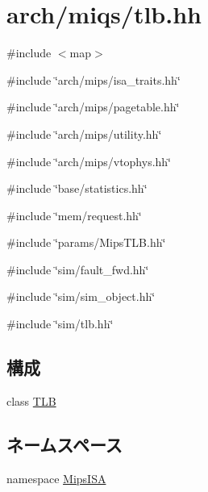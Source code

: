 \hypertarget{arch_2miqs_2tlb_8hh}{
\section{arch/miqs/tlb.hh}
\label{arch_2miqs_2tlb_8hh}
}
{\ttfamily \#include $<$map$>$}\par
{\ttfamily \#include \char`\"{}arch/mips/isa\_\-traits.hh\char`\"{}}\par
{\ttfamily \#include \char`\"{}arch/mips/pagetable.hh\char`\"{}}\par
{\ttfamily \#include \char`\"{}arch/mips/utility.hh\char`\"{}}\par
{\ttfamily \#include \char`\"{}arch/mips/vtophys.hh\char`\"{}}\par
{\ttfamily \#include \char`\"{}base/statistics.hh\char`\"{}}\par
{\ttfamily \#include \char`\"{}mem/request.hh\char`\"{}}\par
{\ttfamily \#include \char`\"{}params/MipsTLB.hh\char`\"{}}\par
{\ttfamily \#include \char`\"{}sim/fault\_\-fwd.hh\char`\"{}}\par
{\ttfamily \#include \char`\"{}sim/sim\_\-object.hh\char`\"{}}\par
{\ttfamily \#include \char`\"{}sim/tlb.hh\char`\"{}}\par
\subsection*{構成}
\begin{DoxyCompactItemize}
\item 
class \hyperlink{classMipsISA_1_1TLB}{TLB}
\end{DoxyCompactItemize}
\subsection*{ネームスペース}
\begin{DoxyCompactItemize}
\item 
namespace \hyperlink{namespaceMipsISA}{MipsISA}
\end{DoxyCompactItemize}

